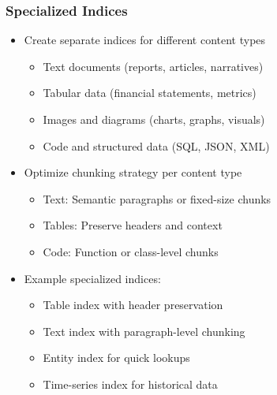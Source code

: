 {    \begin{frame}
        \frametitle{Specialized Indices}
        \begin{itemize}
            \item Create separate indices for different content types
            \begin{itemize}
                \item Text documents (reports, articles, narratives)
                \item Tabular data (financial statements, metrics)
                \item Images and diagrams (charts, graphs, visuals)
                \item Code and structured data (SQL, JSON, XML)
            \end{itemize}
            \item Optimize chunking strategy per content type
            \begin{itemize}
                \item Text: Semantic paragraphs or fixed-size chunks
                \item Tables: Preserve headers and context
                \item Code: Function or class-level chunks
            \end{itemize}
            \item Example specialized indices:
            \begin{itemize}
                \item Table index with header preservation
                \item Text index with paragraph-level chunking
                \item Entity index for quick lookups
                \item Time-series index for historical data
            \end{itemize}
        \end{itemize}
    \end{frame}

}
